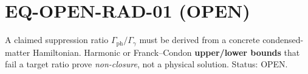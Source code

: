\documentclass{article}
\begin{document}
\section*{EQ-OPEN-RAD-01 (OPEN)}
A claimed suppression ratio $\Gamma_{\mathrm{ph}}/\Gamma_{\gamma}$ must be derived
from a concrete condensed-matter Hamiltonian. Harmonic or Franck--Condon
\textbf{upper/lower bounds} that fail a target ratio prove \emph{non-closure},
not a physical solution. Status: OPEN.
\end{document}
